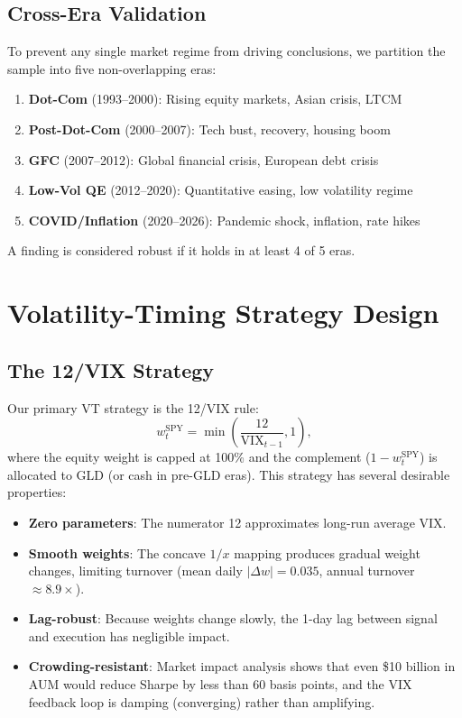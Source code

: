 \documentclass[12pt,a4paper]{article}
\begin{document}
\subsection{Cross-Era Validation}

To prevent any single market regime from driving conclusions, we partition the sample into five non-overlapping eras:

\begin{enumerate}
    \item \textbf{Dot-Com} (1993--2000): Rising equity markets, Asian crisis, LTCM
    \item \textbf{Post-Dot-Com} (2000--2007): Tech bust, recovery, housing boom
    \item \textbf{GFC} (2007--2012): Global financial crisis, European debt crisis
    \item \textbf{Low-Vol QE} (2012--2020): Quantitative easing, low volatility regime
    \item \textbf{COVID/Inflation} (2020--2026): Pandemic shock, inflation, rate hikes
\end{enumerate}

A finding is considered robust if it holds in at least 4 of 5 eras.


\section{Volatility-Timing Strategy Design}
\label{sec:strategy}

\subsection{The 12/VIX Strategy}

Our primary VT strategy is the 12/VIX rule:
\begin{equation}
w_t^{\text{SPY}} = \min\left(\frac{12}{\text{VIX}_{t-1}}, 1\right),
\label{eq:12vix}
\end{equation}
where the equity weight is capped at 100\% and the complement ($1 - w_t^{\text{SPY}}$) is allocated to GLD (or cash in pre-GLD eras). This strategy has several desirable properties:
\begin{itemize}
    \item \textbf{Zero parameters}: The numerator 12 approximates long-run average VIX.
    \item \textbf{Smooth weights}: The concave $1/x$ mapping produces gradual weight changes, limiting turnover (mean daily $|\Delta w| = 0.035$, annual turnover $\approx 8.9\times$).
    \item \textbf{Lag-robust}: Because weights change slowly, the 1-day lag between signal and execution has negligible impact.
    \item \textbf{Crowding-resistant}: Market impact analysis shows that even \$10 billion in AUM would reduce Sharpe by less than 60 basis points, and the VIX feedback loop is damping (converging) rather than amplifying.
\end{itemize}
\end{document}

